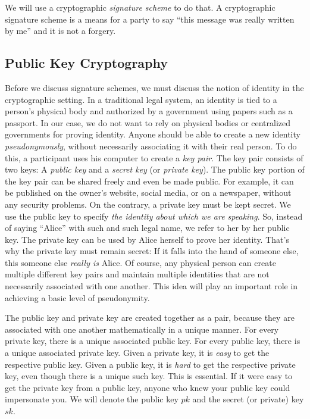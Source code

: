 We will use a cryptographic \emph{signature scheme} to do that. A cryptographic signature
scheme is a means for a party to say ``this message was really written by me'' and it is
not a forgery.

\subsection*{Public Key Cryptography}

Before we discuss signature schemes, we must discuss the notion of identity in the cryptographic
setting. In a traditional legal system, an identity is tied to a person's physical body
and authorized by a government using papers such as a passport. In our case, we do not want
to rely on physical bodies or centralized governments for proving identity. Anyone should be
able to create a new identity \emph{pseudonymously}, without necessarily associating it with
their real person. To do this, a participant uses his computer to create a \emph{key pair}.
The key pair consists of two keys: A \emph{public key} and a \emph{secret key}
(or \emph{private key}). The public key portion of the key pair can be shared freely and even
be made public. For example, it can be published on the owner's website, social media, or on
a newspaper, without any security problems. On the contrary, a private key must be kept secret.
We use the public key to specify \emph{the identity about which we are speaking}. So, instead
of saying ``Alice'' with such and such legal name, we refer to her by her public
key. The private key can be used by Alice herself to prove her identity. That's why the
private key must remain secret: If it falls into the hand of someone else, this someone
else \emph{really is} Alice. Of course, any physical person can create multiple different
key pairs and maintain multiple identities that are not necessarily associated with one
another. This idea will play an important role in achieving a basic level of pseudonymity.

The public key and private key are created together as a pair, because they are associated
with one another mathematically in a unique manner. For every private key, there is a unique
associated public key. For every public key, there is a unique associated private key.
Given a private key, it is \emph{easy} to get the respective public key. Given a public
key, it is \emph{hard} to get the respective private key, even though there is a unique
such key. This is essential. If it were easy to get the private key from a public key,
anyone who knew your public key could impersonate you. We will denote the public key
$pk$
and the secret (or private) key
$sk$.

